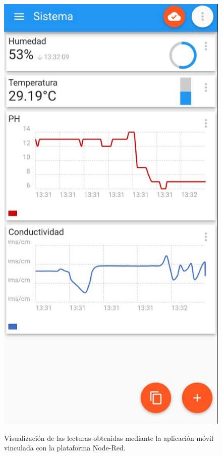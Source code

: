 \begin{figure}[H]
\centering
         \includegraphics[scale=0.5]{imgs/app1.jpeg} \\
    \caption{Visualización de las lecturas obtenidas mediante la aplicación móvil vinculada con la plataforma Node-Red.} \label{app}
\end{figure}



